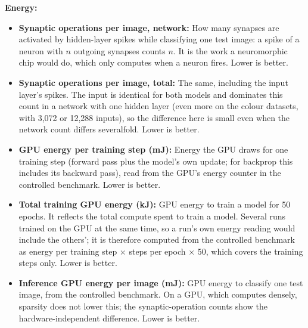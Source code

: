 \documentclass{article}
\begin{document}
{\noindent\textbf{Energy:}
\begin{itemize}
  \item \textbf{Synaptic operations per image, network:} How many synapses are activated by hidden-layer spikes while classifying one test image: a spike of a neuron with $n$ outgoing synapses counts $n$. It is the work a neuromorphic chip would do, which only computes when a neuron fires. Lower is better.
  \item \textbf{Synaptic operations per image, total:} The same, including the input layer's spikes. The input is identical for both models and dominates this count in a network with one hidden layer (even more on the colour datasets, with 3{,}072 or 12{,}288 inputs), so the difference here is small even when the network count differs severalfold. Lower is better.
  \item \textbf{GPU energy per training step (mJ):} Energy the GPU draws for one training step (forward pass plus the model's own update; for backprop this includes its backward pass), read from the GPU's energy counter in the controlled benchmark. Lower is better.
  \item \textbf{Total training GPU energy (kJ):} GPU energy to train a model for 50 epochs. It reflects the total compute spent to train a model. Several runs trained on the GPU at the same time, so a run's own energy reading would include the others'; it is therefore computed from the controlled benchmark as energy per training step $\times$ steps per epoch $\times$ 50, which covers the training steps only. Lower is better.
  \item \textbf{Inference GPU energy per image (mJ):} GPU energy to classify one test image, from the controlled benchmark. On a GPU, which computes densely, sparsity does not lower this; the synaptic-operation counts show the hardware-independent difference. Lower is better.
\end{itemize}

}
\end{document}
